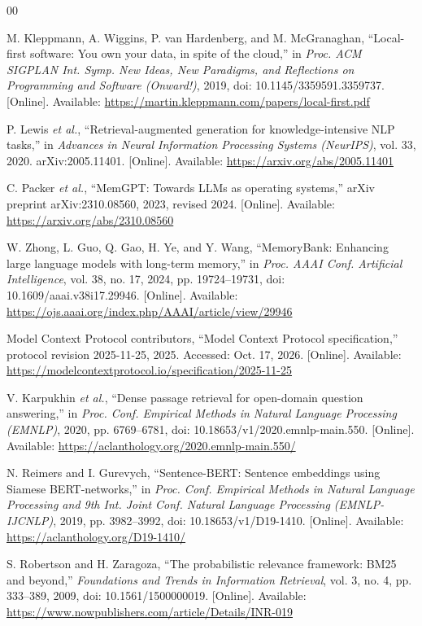 \documentclass[conference,letterpaper]{IEEEtran}
\begin{document}
\begin{thebibliography}{00}

M. Kleppmann, A. Wiggins, P. van Hardenberg, and M. McGranaghan, ``Local-first software: You own your data, in spite of the cloud,'' in \emph{Proc. ACM SIGPLAN Int. Symp. New Ideas, New Paradigms, and Reflections on Programming and Software (Onward!)}, 2019, doi: 10.1145/3359591.3359737. [Online]. Available: \url{https://martin.kleppmann.com/papers/local-first.pdf}

P. Lewis \emph{et al.}, ``Retrieval-augmented generation for knowledge-intensive NLP tasks,'' in \emph{Advances in Neural Information Processing Systems (NeurIPS)}, vol. 33, 2020. arXiv:2005.11401. [Online]. Available: \url{https://arxiv.org/abs/2005.11401}

C. Packer \emph{et al.}, ``MemGPT: Towards LLMs as operating systems,'' arXiv preprint arXiv:2310.08560, 2023, revised 2024. [Online]. Available: \url{https://arxiv.org/abs/2310.08560}

W. Zhong, L. Guo, Q. Gao, H. Ye, and Y. Wang, ``MemoryBank: Enhancing large language models with long-term memory,'' in \emph{Proc. AAAI Conf. Artificial Intelligence}, vol. 38, no. 17, 2024, pp. 19724--19731, doi: 10.1609/aaai.v38i17.29946. [Online]. Available: \url{https://ojs.aaai.org/index.php/AAAI/article/view/29946}

Model Context Protocol contributors, ``Model Context Protocol specification,'' protocol revision 2025-11-25, 2025. Accessed: Oct. 17, 2026. [Online]. Available: \url{https://modelcontextprotocol.io/specification/2025-11-25}

V. Karpukhin \emph{et al.}, ``Dense passage retrieval for open-domain question answering,'' in \emph{Proc. Conf. Empirical Methods in Natural Language Processing (EMNLP)}, 2020, pp. 6769--6781, doi: 10.18653/v1/2020.emnlp-main.550. [Online]. Available: \url{https://aclanthology.org/2020.emnlp-main.550/}

N. Reimers and I. Gurevych, ``Sentence-BERT: Sentence embeddings using Siamese BERT-networks,'' in \emph{Proc. Conf. Empirical Methods in Natural Language Processing and 9th Int. Joint Conf. Natural Language Processing (EMNLP-IJCNLP)}, 2019, pp. 3982--3992, doi: 10.18653/v1/D19-1410. [Online]. Available: \url{https://aclanthology.org/D19-1410/}

S. Robertson and H. Zaragoza, ``The probabilistic relevance framework: BM25 and beyond,'' \emph{Foundations and Trends in Information Retrieval}, vol. 3, no. 4, pp. 333--389, 2009, doi: 10.1561/1500000019. [Online]. Available: \url{https://www.nowpublishers.com/article/Details/INR-019}


\end{thebibliography}
\end{document}
